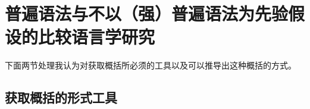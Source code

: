 
\chapter[普遍语法与没有普遍语法的比较语言学]{普遍语法与不以（强）普遍语法为先验假设的比较语言学研究}
\label{Abschnitt-UG-mit-Hierarchie}

下面两节处理我认为对获取概括所必须的工具以及可以推导出这种概括的方式。

\section{获取概括的形式工具}

